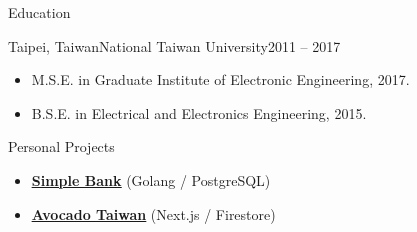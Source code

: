 \documentclass[]{mcdowellcv}
\begin{document}
	\begin{cvsection}{Education}
		\begin{cvsubsection}{Taipei, Taiwan}{National Taiwan University}{2011 -- 2017}
			\begin{itemize}
				\item M.S.E. in Graduate Institute of Electronic Engineering, 2017.
				\item B.S.E. in Electrical and Electronics Engineering, 2015.
			\end{itemize}
		\end{cvsubsection}
	\end{cvsection}
	
	\begin{cvsection}{Personal Projects}
		\begin{cvsubsection}{}{}{}
			\begin{itemize}
				\item \textbf{\underline{\href{https://github.com/hhow09/simple_bank}{Simple Bank}}} (Golang / PostgreSQL)
				\item \textbf{\underline{\href{https://avocadotaiwan.com}{Avocado Taiwan}}} (Next.js / Firestore)
			\end{itemize}
		\end{cvsubsection}
	\end{cvsection}
	
\end{document}
